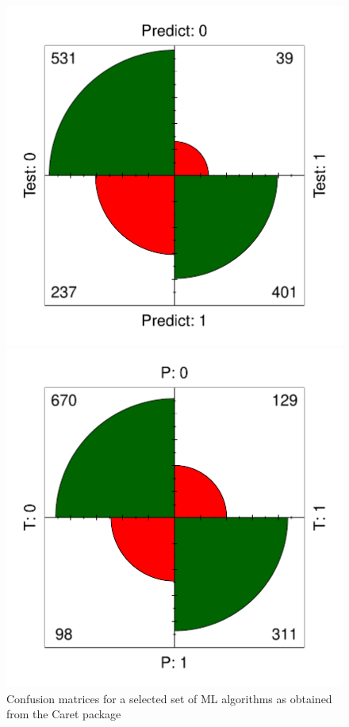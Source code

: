 \documentclass[12pt,%
               a4paper,%
               oneside,openany,%
               titlepage,%
               headinclude,footinclude,%
               BCOR5mm,%
               cleardoublepage=empty,%
               tablecaptionabove,%
               floatperchapter,
               ]{scrreprt}                 %
\begin{document}
\begin{figure}[ht]
\begin{minipage}[b]{0.5\linewidth}
    \vspace{4ex}
  \end{minipage} \\
  \begin{minipage}[b]{0.5\linewidth}
    \centering
    \includegraphics[width=.9\linewidth]{Figures/QDA_confusion.pdf}
    \vspace{4ex}
  \end{minipage}%
    \begin{minipage}[b]{0.5\linewidth}
    \centering
    \includegraphics[width=.9\linewidth]{Figures/Logisic_confusion.pdf}
    \vspace{4ex}
  \end{minipage}%
\caption{Confusion matrices for a selected set of ML algorithms as obtained from the Caret package \cite{kuhn2008building,caret}}
\label{CF_ML}
  \end{figure}
  
\end{document}
